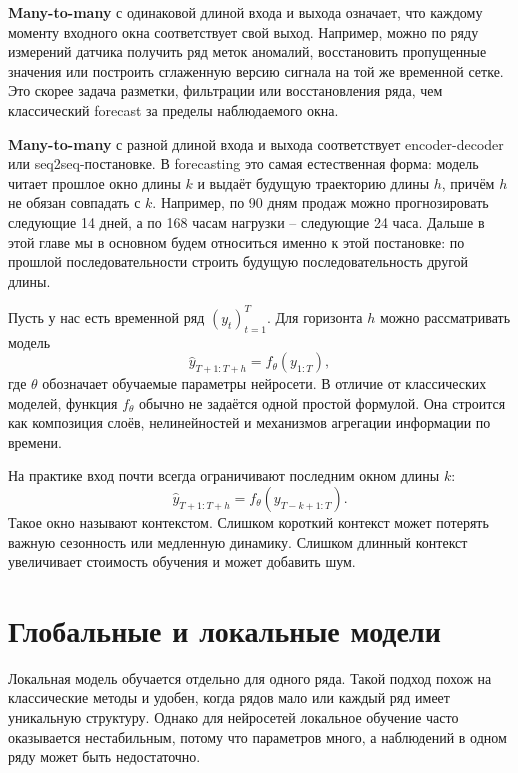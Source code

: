 \documentclass[12pt,fleqn]{article}
\begin{document}
\textbf{Many-to-many} с одинаковой длиной входа и выхода означает, что каждому моменту входного окна соответствует свой выход.
Например, можно по ряду измерений датчика получить ряд меток аномалий, восстановить пропущенные значения или построить сглаженную версию сигнала на той же временной сетке.
Это скорее задача разметки, фильтрации или восстановления ряда, чем классический forecast за пределы наблюдаемого окна.

\textbf{Many-to-many} с разной длиной входа и выхода соответствует encoder-decoder или seq2seq-постановке.
В forecasting это самая естественная форма: модель читает прошлое окно длины $k$ и выдаёт будущую траекторию длины $h$, причём $h$ не обязан совпадать с $k$.
Например, по 90 дням продаж можно прогнозировать следующие 14 дней, а по 168 часам нагрузки -- следующие 24 часа.
Дальше в этой главе мы в основном будем относиться именно к этой постановке: по прошлой последовательности строить будущую последовательность другой длины.

Пусть у нас есть временной ряд $(y_t)_{t=1}^{T}$.
Для горизонта $h$ можно рассматривать модель
\begin{equation}
  \hat{y}_{T+1:T+h} = f_\theta(y_{1:T}),
\end{equation}
где $\theta$ обозначает обучаемые параметры нейросети.
В отличие от классических моделей, функция $f_\theta$ обычно не задаётся одной простой формулой.
Она строится как композиция слоёв, нелинейностей и механизмов агрегации информации по времени.

На практике вход почти всегда ограничивают последним окном длины $k$:
\begin{equation}
  \hat{y}_{T+1:T+h} = f_\theta(y_{T-k+1:T}).
\end{equation}
Такое окно называют контекстом.
Слишком короткий контекст может потерять важную сезонность или медленную динамику.
Слишком длинный контекст увеличивает стоимость обучения и может добавить шум.

\section{Глобальные и локальные модели}

Локальная модель обучается отдельно для одного ряда.
Такой подход похож на классические методы и удобен, когда рядов мало или каждый ряд имеет уникальную структуру.
Однако для нейросетей локальное обучение часто оказывается нестабильным, потому что параметров много, а наблюдений в одном ряду может быть недостаточно.
\end{document}
